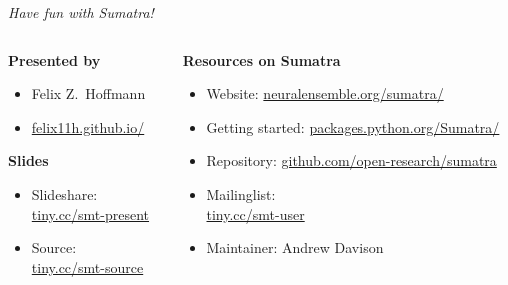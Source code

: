 \begin{frame}
  \begin{center} 
    \Large \textit{Have fun with Sumatra!}
  \end{center}
    
  \vspace{0.35cm}

  \begin{columns}[t]
    \begin{column}{0.4\textwidth}        
      \textbf{Presented by}
      \normalsize
      \vspace{0.18cm}
      \begin{itemize}[leftmargin=0.6cm]
        \item[] Felix Z.~Hoffmann
        \item[] \href{http://felix11h.github.io/}{felix11h.github.io/}
      \end{itemize}

      \vspace{0.38cm}
      \textbf{Slides}
      \normalsize
      \vspace{0.18cm}
      \begin{itemize}[leftmargin=0.6cm]
        \item[] Slideshare:\\ %
          \href{http://tiny.cc/smt-present}{tiny.cc/smt-present}
        \item[] Source:\\ %
          \href{http://tiny.cc/smt-source}{tiny.cc/smt-source}
      \end{itemize}
    \end{column}
    \begin{column}{0.64\textwidth}
      \textbf{Resources on Sumatra}
      \vspace{0.28cm}
      \normalsize 
      \begin{itemize}[leftmargin=0.6cm]
        \item[] Website: %
          \href{http://neuralensemble.org/sumatra/}{%
            neuralensemble.org/sumatra/}\\
        \item[]Getting started: %
          \href{http://packages.python.org/Sumatra/}{%
            packages.python.org/Sumatra/}\\
        \item[]Repository: %
          \href{https://github.com/open-research/sumatra}{%
            github.com/open-research/sumatra}
        \item[] Mailinglist: \\%
          \href{http://tiny.cc/smt-user}{tiny.cc/smt-user}
        \item[] Maintainer: Andrew Davison 
      \end{itemize}
    \end{column}
  \end{columns}


\end{frame}

